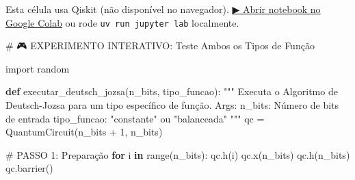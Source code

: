 \documentclass[
  brazilian,
]{report}
\newenvironment{Shaded}{\begin{snugshade}}{\end{snugshade}}
\newcommand{\BuiltInTok}[1]{\textcolor[rgb]{0.00,0.23,0.31}{#1}}
\newcommand{\CommentTok}[1]{\textcolor[rgb]{0.37,0.37,0.37}{#1}}
\newcommand{\ControlFlowTok}[1]{\textcolor[rgb]{0.00,0.23,0.31}{\textbf{#1}}}
\newcommand{\DecValTok}[1]{\textcolor[rgb]{0.68,0.00,0.00}{#1}}
\newcommand{\ImportTok}[1]{\textcolor[rgb]{0.00,0.46,0.62}{#1}}
\newcommand{\KeywordTok}[1]{\textcolor[rgb]{0.00,0.23,0.31}{\textbf{#1}}}
\newcommand{\NormalTok}[1]{\textcolor[rgb]{0.00,0.23,0.31}{#1}}
\newcommand{\OperatorTok}[1]{\textcolor[rgb]{0.37,0.37,0.37}{#1}}
\begin{document}
\begin{tcolorbox}[enhanced jigsaw, arc=.35mm, bottomrule=.15mm, bottomtitle=1mm, breakable, colback=white, colbacktitle=quarto-callout-warning-color!10!white, colframe=quarto-callout-warning-color-frame, coltitle=black, left=2mm, leftrule=.75mm, opacityback=0, opacitybacktitle=0.6, rightrule=.15mm, title=\textcolor{quarto-callout-warning-color}{\faExclamationTriangle}\hspace{0.5em}{⚛️ Célula Qiskit --- execute no Colab ou localmente}, titlerule=0mm, toprule=.15mm, toptitle=1mm]

Esta célula usa Qiskit (não disponível no navegador).
\href{https://colab.research.google.com/github/maxwellamaral/aula-quantum/blob/main/notebooks/05-interference.ipynb}{▶
Abrir notebook no Google Colab} ou rode \texttt{uv\ run\ jupyter\ lab}
localmente.

\begin{Shaded}
\begin{Highlighting}[]


\CommentTok{\# 🎮 EXPERIMENTO INTERATIVO: Teste Ambos os Tipos de Função}

\ImportTok{import}\NormalTok{ random}

\KeywordTok{def}\NormalTok{ executar\_deutsch\_jozsa(n\_bits, tipo\_funcao):}
    \CommentTok{"""}
\CommentTok{    Executa o Algoritmo de Deutsch{-}Jozsa para um tipo específico de função.}
\CommentTok{    }
\CommentTok{    Args:}
\CommentTok{        n\_bits: Número de bits de entrada}
\CommentTok{        tipo\_funcao: "constante" ou "balanceada"}
\CommentTok{    """}
\NormalTok{    qc }\OperatorTok{=}\NormalTok{ QuantumCircuit(n\_bits }\OperatorTok{+} \DecValTok{1}\NormalTok{, n\_bits)}
    
    \CommentTok{\# PASSO 1: Preparação}
    \ControlFlowTok{for}\NormalTok{ i }\KeywordTok{in} \BuiltInTok{range}\NormalTok{(n\_bits):}
\NormalTok{        qc.h(i)}
\NormalTok{    qc.x(n\_bits)}
\NormalTok{    qc.h(n\_bits)}
\NormalTok{    qc.barrier()}
    

\end{Highlighting}
\end{Shaded}
\end{tcolorbox}
\end{document}

